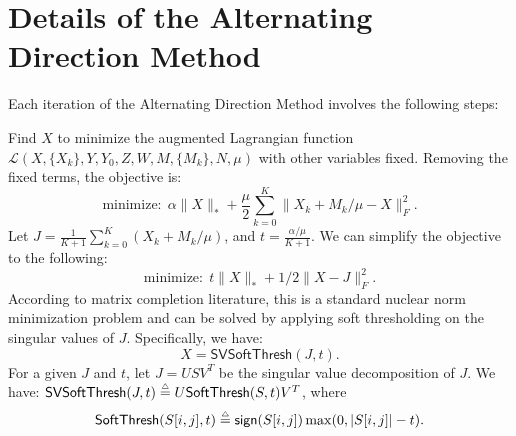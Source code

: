\section{Details of the Alternating Direction Method}
\label{appendix:adm}

Each iteration of the Alternating Direction Method involves the
following steps:
\begin{senumerate}
\item Find $X$ to minimize the augmented Lagrangian function\\
  $\mathcal{L}(X,\{X_k\},Y,Y_0,Z,W,M,\{M_k\},N,\mu)$ with other
  variables fixed. Removing the fixed terms, the objective is:
\[
\text{minimize:}~~ \alpha\|X\|_* + \frac{\mu}{2} \sum_{k=0}^K
\|X_k+M_k/\mu - X\|_F^2.
\]
Let $J = \frac{1}{K+1}\sum_{k=0}^K (X_{k} + M_{k}/\mu)$, and
$t = \frac{\alpha/\mu}{K+1}$. We can simplify the objective to the following:
\[
\text{minimize:}~~ t\|X\|_* + 1/2\|X - J\|_F^2.
\]
According to matrix completion literature, this is a standard
nuclear norm minimization problem and can be solved by applying
soft thresholding on the singular values of $J$. Specifically, 
we have:
\[
X = \mathsf{SVSoftThresh}(J,t).
\]
For a given $J$ and $t$, let $J=U S V^T$ be the singular value
decomposition of $J$.  We have: $\mathsf{SVSoftThresh}(J,t)\stackrel{\scriptscriptstyle{\triangle}}{=} U
\mathsf{SoftThresh}(S,t) V^T$, where
\[
\mathsf{SoftThresh}(S[i,j],t) \stackrel{\scriptscriptstyle{\triangle}}{=} \mathsf{sign}(S[i,j])
\max(0, |S[i,j]|-t).
\]



\end{senumerate}
